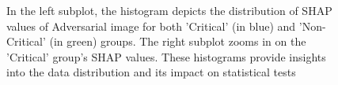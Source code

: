 \documentclass[10pt, conference, a4paper, final]{IEEEtran}
\begin{document}
\begin{figure}[h]
\begin{subfigure}{\columnwidth}
        \end{subfigure}
        \label{fig:histograms}
        \caption{ In the left subplot, the histogram depicts the distribution of SHAP values of Adversarial image for both 'Critical' (in blue) and 'Non-Critical' (in green) groups. The right subplot zooms in on the 'Critical' group's SHAP values. These histograms provide insights into the data distribution and its impact on statistical tests}
    \end{figure}

    




\end{document}
